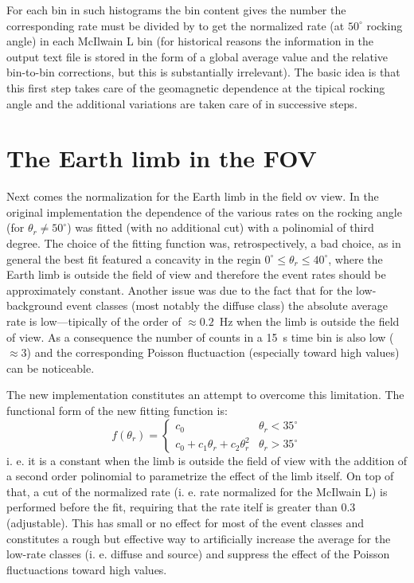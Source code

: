 \documentclass[a4paper,twocolumn]{article}
\begin{document}
For each bin in such histograms the bin content gives the number the
corresponding rate must be divided by to get the normalized rate (at $50^\circ$
rocking angle) in each McIlwain L bin (for historical reasons the information
in the output text file is stored in the form of a global average value and
the relative bin-to-bin corrections, but this is substantially irrelevant).
The basic idea is that this first step takes care of the geomagnetic
dependence at the tipical rocking angle and the additional variations are
taken care of in successive steps.

\section{The Earth limb in the FOV}

Next comes the normalization for the Earth limb in the field ov view. In the
original implementation the dependence of the various rates on the rocking
angle (for $\theta_r \neq 50^\circ$) was fitted (with no additional cut) with
a polinomial of third degree.
The choice of the fitting function was, retrospectively, a bad choice, as
in general the best fit featured a concavity in the regin
$0^\circ \leq \theta_r \leq 40^\circ$, where the Earth limb is outside the
field of view and therefore the event rates should be approximately constant.
Another issue was due to the fact that for the low-background event classes
(most notably the diffuse class) the absolute average rate is low---tipically
of the order of $\approx 0.2$~Hz when the limb is outside the field of view.
As a consequence the number of counts in a 15~s time bin is also low
($\approx 3$) and the corresponding Poisson fluctuaction (especially toward
high values) can be noticeable.

The new implementation constitutes an attempt to overcome this limitation. The
functional form of the new fitting function is:
\begin{equation}
  f(\theta_r) =
  \begin{cases}
    c_0 & \theta_r < 35^\circ\\
    c_0 + c_1 \theta_r + c_2 \theta_r^2 & \theta_r > 35^\circ
  \end{cases}
\end{equation}
i. e. it is a constant when the limb is outside the field of view with the
addition of a second order polinomial to parametrize the effect of the limb
itself. On top of that, a cut of the normalized rate (i. e. rate normalized
for the McIlwain L) is performed before the fit, requiring that the rate itelf
is greater than 0.3 (adjustable). This has small or no effect for most of the
event classes and constitutes a rough but effective way to artificially
increase the average for the low-rate classes (i. e. diffuse and source) and
suppress the effect of the Poisson fluctuactions toward high values.
\end{document}

